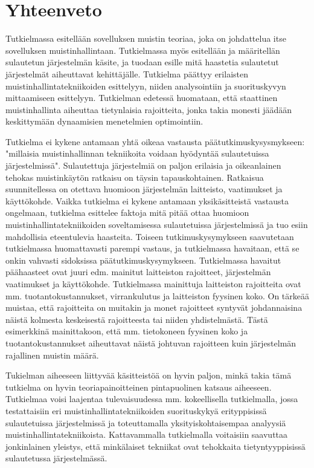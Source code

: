\chapter{Yhteenveto} \label{Yhteenveto}

Tutkielmassa esitellään sovelluksen muistin teoriaa, joka on johdattelua itse sovelluksen muistinhallintaan. Tutkielmassa myös esitellään ja määritellän sulautetun järjestelmän käsite, ja tuodaan esille mitä haastetia sulautetut järjestelmät aiheuttavat kehittäjälle. Tutkielma päättyy erilaisten muistinhallintatekniikoiden esittelyyn, niiden analysointiin ja suorituskyvyn mittaamiseen esittelyyn. Tutkielman edetessä huomataan, että staattinen muistinhallinta aiheuttaa tietynlaisia rajoitteita, jonka takia monesti jäädään keskittymään dynaamisien menetelmien optimointiin.

Tutkielma ei kykene antamaan yhtä oikeaa vastausta päätutkimuskysysmykseen: "millaisia muistinhallinnan tekniikoita voidaan hyödyntää sulautetuissa järjestelmissä". Sulautettuja järjestelmiä on paljon erilaisia ja oikeanlainen tehokas muistinkäytön ratkaisu on täysin tapauskohtainen. Ratkaisua suunnitellessa on otettava huomioon järjestelmän laitteisto, vaatimukset ja käyttökohde. Vaikka tutkielma ei kykene antamaan yksikäsitteistä vastausta ongelmaan, tutkielma esittelee faktoja mitä pitää ottaa huomioon muistinhallintatekniikoiden soveltamisessa sulautetuissa järjestelmissä ja tuo esiin mahdollisia eteentulevia haasteita. Toiseen tutkimuskysymykseen saavutetaan tutkielmassa huomattavasti parempi vastaus, ja tutkielmassa havaitaan, että se onkin vahvasti sidoksissa päätutkimuskysymykseen. Tutkielmassa havaitut päähaasteet ovat juuri edm. mainitut laitteiston rajoitteet, järjestelmän vaatimukset ja käyttökohde. Tutkielmassa mainittuja laitteiston rajoitteita ovat mm. tuotantokustannukset, virrankulutus ja laitteiston fyysinen koko. On tärkeää muistaa, että rajoitteita on muitakin ja monet rajoitteet syntyvät johdannaisina näistä kolmesta keskeisestä rajoitteesta tai niiden yhdistelmästä. Tästä esimerkkinä mainittakoon, että mm. tietokoneen fyysinen koko ja tuotantokustannukset aiheuttavat näistä johtuvan rajoitteen kuin järjestelmän rajallinen muistin määrä.

Tukielman aiheeseen liittyvää käsitteistöä on hyvin paljon, minkä takia tämä tutkielma on hyvin teoriapainoitteinen pintapuolinen katsaus aiheeseen. Tutkielmaa voisi laajentaa tulevaisuudessa mm. kokeellisella tutkielmalla, jossa testattaisiin eri muistinhallintatekniikoiden suorituskykyä erityppisissä sulautetuissa järjestelmissä ja toteuttamalla yksityiskohtaisempaa analyysiä muistinhallintatekniikoista. Kattavammalla tutkielmalla voitaisiin saavuttaa jonkinlainen yleistys, että minkälaiset tekniikat ovat tehokkaita tietyntyyppisissä sulautetussa järjestelmässä.
